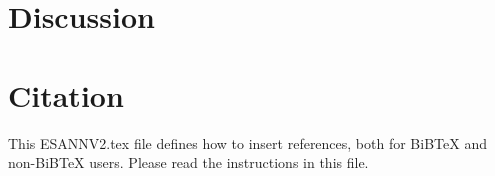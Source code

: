 \documentclass{esannV2}
\begin{document}
\section{Discussion}

\section{Citation}
This ESANNV2.tex file defines how to insert references, both for
BiBTeX and non-BiBTeX users.  Please read the instructions in this
file.


\begin{footnotesize}





\end{footnotesize}

\end{document}
